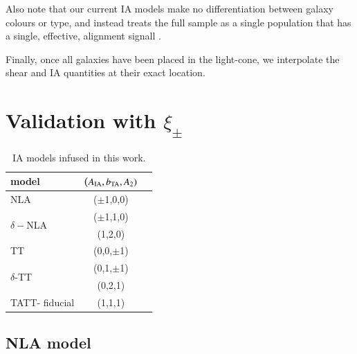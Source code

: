 \documentclass[useAMS,usenatbib]{mn2e}
\begin{document}
Also note that our current IA models make no differentiation between galaxy colours or type, and instead treats the full sample as a single population that has a single, effective, alignment signall \citep[see][for an example with a red/blue split]{DESY1_IA_Samuroff}.


Finally, once all galaxies have been placed in the light-cone, we interpolate the shear and IA quantities at their exact location.

\section{Validation with $\xi_{\pm}$}
\label{sec:validation}




\begin{table}
   \centering
   \begin{tabular}{@{} lcr @{}} %
      \hline
      \hline
      model   		& ($A_{\rm IA}, b_{\rm TA}, A_2)$ \\
      \hline
      NLA     		& {($\pm$1,0,0) }&  \\
      \multirow{2}{*}{$\delta-$NLA }  	&   {($\pm$1,1,0)}   \\
      							&  {(1,2,0)}   \\
      TT 			&  {(0,0,$\pm$1)} &  \\
      \multirow{2}{*}{$\delta$-TT} 	&  {(0,1,$\pm$1)}   \\
      				&  {(0,2,1)}   \\
      TATT- fiducial	&  { (1,1,1)}  \\
      \hline
      \hline

   \end{tabular}
   \caption{IA models infused in this work.}
   \label{table:IAmodels}
\end{table}


\subsection{NLA model}
\label{subsubsec:sigma_G}
\end{document}
